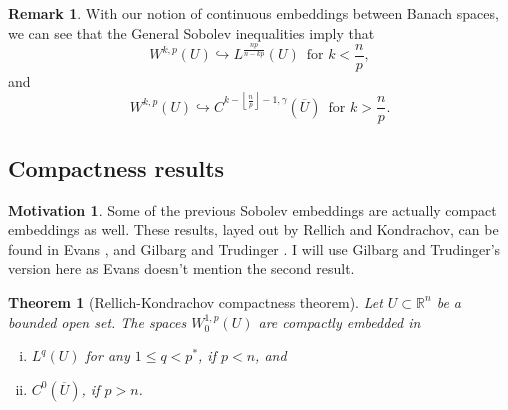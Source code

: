 \documentclass[11pt]{article}
\newtheorem{theorem}{Theorem}
\theoremstyle{definition}
\newtheorem*{remark}{Remark}
\newtheorem*{motivation}{Motivation}
\begin{document}
\begin{remark}
	With our notion of continuous embeddings between Banach spaces, we can see that the General Sobolev inequalities
	imply that
	\begin{equation*}
		W^{k,p}(U) \hookrightarrow L^{\frac{np}{n - kp}}(U) \,\text{ for } k < \frac{n}{p},
	\end{equation*}
	and
	\begin{equation*}
		W^{k,p}(U) \hookrightarrow C^{k-\left\lfloor\frac{n}{p}\right\rfloor-1, \gamma}(\overline{U}) \,\text{ for } k > \frac{n}{p}.
	\end{equation*}
\end{remark}

\newpage

\subsection{Compactness results}
\begin{motivation}
	Some of the previous Sobolev embeddings are actually compact embeddings as well.
	These results, layed out by Rellich and Kondrachov, can be found in Evans \cite{evans1998partial}, and Gilbarg and Trudinger \cite{gilbarg2001elliptic}.
	I will use Gilbarg and Trudinger's version here as Evans doesn't mention the second result.
\end{motivation}

\begin{theorem}[Rellich-Kondrachov compactness theorem]
	Let $U \subset \mathbb{R}^n$ be a bounded open set. The spaces $W_0^{1,p}(U)$ are compactly embedded in
	\begin{enumerate}[(i)]
		\item $L^q(U)$ for any $1 \leq q < p^*$, if $p<n$, and
		\item $C^0(\overline{U})$, if $p>n$.
	\end{enumerate}
\end{theorem}

\newpage
\end{document}
